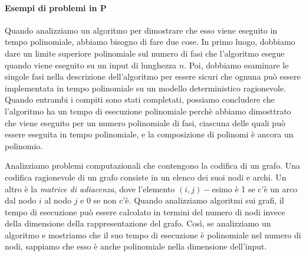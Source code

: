 \documentclass[12pt]{report}
\begin{document}
\paragraph{Esempi di problemi in P} Quando analizziamo un algoritmo per dimostrare che esso viene eseguito in tempo polinomiale, abbiamo bisogno di fare due cose. In primo luogo, dobbiamo dare un limite superiore polinomiale sul numero di fasi che l'algoritmo esegue quando viene eseguito su un input di lunghezza $n$. Poi, dobbiamo esaminare le singole fasi nella descrizione dell'algoritmo per essere sicuri che ognuna può essere implementata in tempo polinomiale su un modello deterministico ragionevole. Quando entrambi i compiti sono stati completati, possiamo concludere che l'algoritmo ha un tempo di esecuzione polinomiale perchè abbiamo dimosttrato che viene eseguito per un numero polinomiale di fasi, ciascuna delle quali può essere eseguita in tempo polinomiale, e la composizione di polinomi è ancora un polinomio.

Analizziamo problemi computazionali che contengono la codifica di un grafo. Una codifica ragionevole di un grafo consiste in un elenco dei suoi nodi e archi. Un altro è la \textit{matrice di adiacenza}, dove l'elemento $(i, j)-$esimo è 1 se c'è un arco dal nodo $i$ al nodo $j$ e 0 se non c'è. Quando analizziamo algoritmi sui grafi, il tempo di esecuzione può essere calcolato in termini del numero di nodi invece della dimensione della rappresentazione del grafo. Così, se analizziamo un algoritmo e mostriamo che il suo tempo di esecuzione è polinomiale nel numero di nodi, sappiamo che esso è anche polinomiale nella dimensione dell'input.
\end{document}
